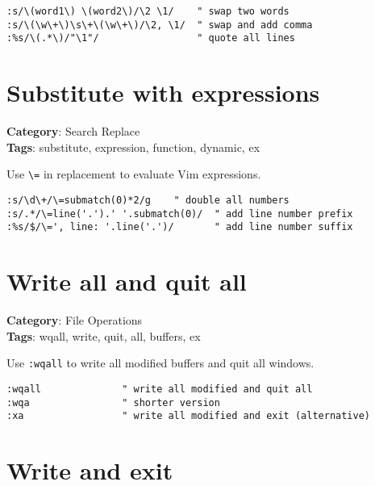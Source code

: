{{{{\begin{Exa*}{}
\begin{Verbatim}[fontsize=\footnotesize, breaklines, breakanywhere]
:s/\(word1\) \(word2\)/\2 \1/    " swap two words
:s/\(\w\+\)\s\+\(\w\+\)/\2, \1/  " swap and add comma
:%s/\(.*\)/"\1"/                 " quote all lines
\end{Verbatim}
\end{Exa*}

\section{Substitute with expressions}

\textbf{Category}: Search Replace\\ \textbf{Tags}: substitute, expression, function, dynamic, ex
\vspace{0.5cm}

Use {\footnotesize \Verb§\=§} in replacement to evaluate Vim expressions.

\begin{Exa*}{}
\begin{Verbatim}[fontsize=\footnotesize, breaklines, breakanywhere]
:s/\d\+/\=submatch(0)*2/g    " double all numbers
:s/.*/\=line('.').' '.submatch(0)/  " add line number prefix
:%s/$/\=', line: '.line('.')/       " add line number suffix
\end{Verbatim}
\end{Exa*}

\section{Write all and quit all}

\textbf{Category}: File Operations\\ \textbf{Tags}: wqall, write, quit, all, buffers, ex
\vspace{0.5cm}

Use {\footnotesize \Verb§:wqall§} to write all modified buffers and quit all windows.

\begin{Exa*}{}
\begin{Verbatim}[fontsize=\footnotesize, breaklines, breakanywhere]
:wqall              " write all modified and quit all
:wqa                " shorter version
:xa                 " write all modified and exit (alternative)
\end{Verbatim}
\end{Exa*}

\section{Write and exit}

}}}}
